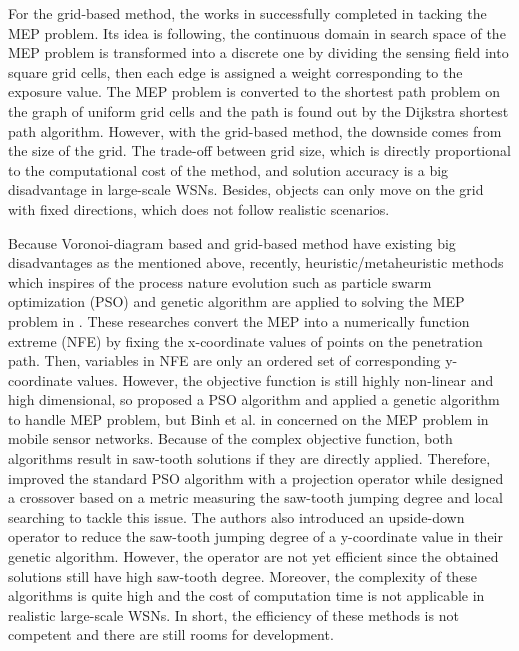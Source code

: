 \documentclass[final]{elsarticle}
\begin{document}
For the grid-based method, the works in \cite{meguerdichian2001exposure, veltri2003minimal,megerian2002exposure, b9, b10} successfully completed in tacking the MEP problem. Its idea is following, the continuous domain in search space of the MEP problem is transformed into a discrete one by dividing the sensing field into square grid cells, then each edge is assigned a weight corresponding to the exposure value. The MEP problem is converted to the shortest path problem on the graph of uniform grid cells and the path is found out by the Dijkstra shortest path algorithm. However, with the grid-based method, the downside comes from the size of the grid. The trade-off between grid size, which is directly proportional to the computational cost of the method, and solution accuracy is a big disadvantage in large-scale WSNs. Besides, objects can only move on the grid with fixed directions, which does not follow realistic scenarios.

Because Voronoi-diagram based and grid-based method have existing big disadvantages as the mentioned above, recently, heuristic/metaheuristic methods which inspires of the process nature evolution such as particle swarm optimization (PSO) and genetic algorithm are applied to solving the MEP problem in \cite{b11,b12,b25,binh2019efficient}. These researches convert the MEP into a numerically function extreme (NFE) \cite{b8} by fixing the x-coordinate values of points on the penetration path. Then, variables in NFE are only an ordered set of corresponding y-coordinate values. However, the objective function is still highly non-linear and high dimensional, so \cite{b11} proposed a PSO algorithm and \cite {b12,b25,binh2019efficient} applied a genetic algorithm to handle MEP problem, but Binh et al. in \cite{b25} concerned on the MEP problem in mobile sensor networks. Because of the complex objective function, both algorithms result in saw-tooth solutions if they are directly applied. Therefore, \cite{b11} improved the standard PSO algorithm with a projection operator while \cite{binh2019efficient} designed a crossover based on a metric measuring the saw-tooth jumping degree and local searching to tackle this issue. The authors \cite{b12} also introduced an upside-down operator to reduce the saw-tooth jumping degree of a y-coordinate value in their genetic algorithm. However, the operator are not yet efficient since the obtained solutions still have high saw-tooth degree. Moreover, the complexity of these algorithms is quite high and the cost of computation time is not applicable in realistic large-scale WSNs. In short, the efficiency of these methods is not competent and there are still rooms for development.
\end{document}

